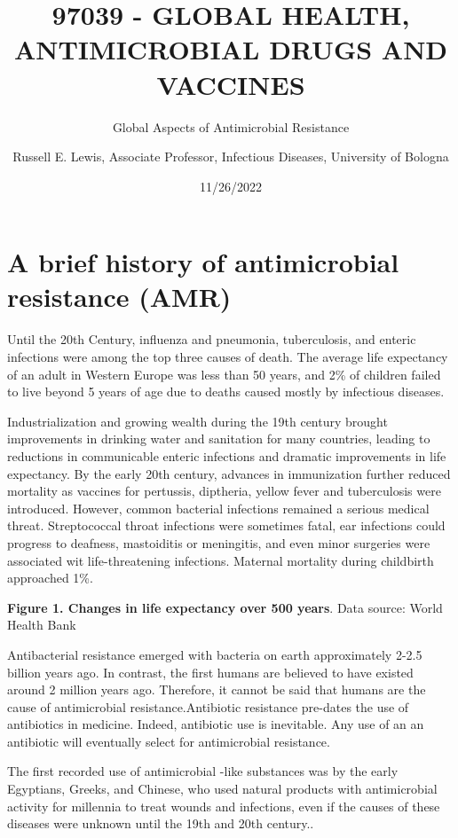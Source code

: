 \documentclass[
]{book}
\title{97039 - GLOBAL HEALTH, ANTIMICROBIAL DRUGS AND VACCINES}
\subtitle{Global Aspects of Antimicrobial Resistance}
\author{Russell E. Lewis, Associate Professor, Infectious Diseases, University of Bologna}
\date{11/26/2022}
\begin{document}
\maketitle

{
\setcounter{tocdepth}{1}
\tableofcontents
}
\hypertarget{a-brief-history-of-antimicrobial-resistance-amr}{%
\section*{A brief history of antimicrobial resistance (AMR)}\label{a-brief-history-of-antimicrobial-resistance-amr}}

Until the 20th Century, influenza and pneumonia, tuberculosis, and enteric infections were among the top three causes of death. The average life expectancy of an adult in Western Europe was less than 50 years, and 2\% of children failed to live beyond 5 years of age due to deaths caused mostly by infectious diseases.

Industrialization and growing wealth during the 19th century brought improvements in drinking water and sanitation for many countries, leading to reductions in communicable enteric infections and dramatic improvements in life expectancy. By the early 20th century, advances in immunization further reduced mortality as vaccines for pertussis, diptheria, yellow fever and tuberculosis were introduced. However, common bacterial infections remained a serious medical threat. Streptococcal throat infections were sometimes fatal, ear infections could progress to deafness, mastoiditis or meningitis, and even minor surgeries were associated wit life-threatening infections. Maternal mortality during childbirth approached 1\%.

\textbf{Figure 1. Changes in life expectancy over 500 years}. Data source: World Health Bank

Antibacterial resistance emerged with bacteria on earth approximately 2-2.5 billion years ago. In contrast, the first humans are believed to have existed around 2 million years ago. Therefore, it cannot be said that humans are the cause of antimicrobial resistance.Antibiotic resistance pre-dates the use of antibiotics in medicine. Indeed, antibiotic use is inevitable. Any use of an an antibiotic will eventually select for antimicrobial resistance.

The first recorded use of antimicrobial -like substances was by the early Egyptians, Greeks, and Chinese, who used natural products with antimicrobial activity for millennia to treat wounds and infections, even if the causes of these diseases were unknown until the 19th and 20th century..
\end{document}
